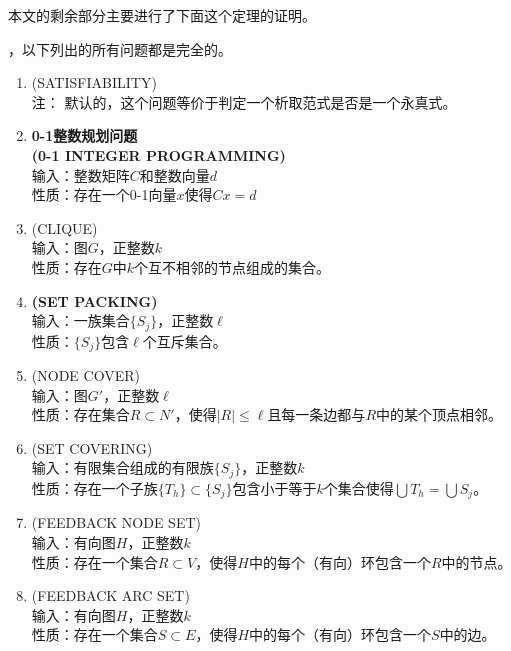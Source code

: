 \documentclass[twocolumn]{article}
\theoremstyle{nonumberplain}%
\begin{document}
\begin{CJK}{UTF8}{gbsn}
    本文的剩余部分主要进行了下面这个定理的证明。

    {}，以下列出的所有问题都是完全的。

    \begin{enumerate}
    \item {(SATISFIABILITY)}\\
    注： 默认的，这个问题等价于判定一个析取范式是否是一个永真式。

    \item {\bf0-1整数规划问题\\(0-1 INTEGER PROGRAMMING)}\\
    输入：整数矩阵$C$和整数向量$d$\\
    性质：存在一个0-1向量$x$使得$Cx=d$

    \item {(CLIQUE)}\\
    输入：图$G$，正整数$k$\\
    性质：存在$G$中$k$个互不相邻的节点组成的集合。

    \item {\bf(SET PACKING)}\\
    输入：一族集合$\{S_j\}$，正整数$\ell$\\
    性质：$\{S_j\}$包含$\ell$个互斥集合。

    \item {(NODE COVER)}\\
    输入：图$G'$，正整数$\ell$\\
    性质：存在集合$R\subset N'$，使得$|R|\leq\ell$且每一条边都与$R$中的某个顶点相邻。

    \item {(SET COVERING)}\\
    输入：有限集合组成的有限族$\{S_j\}$，正整数$k$\\
    性质：存在一个子族$\{T_h\}\subset\{S_j\}$包含小于等于$k$个集合使得$\bigcup T_h=\bigcup S_j$。

    \item {(FEEDBACK NODE SET)}\\
    输入：有向图$H$，正整数$k$\\
    性质：存在一个集合$R\subset V$，使得$H$中的每个（有向）环包含一个$R$中的节点。

    \item {(FEEDBACK ARC SET)}\\
    输入：有向图$H$，正整数$k$\\
    性质：存在一个集合$S\subset E$，使得$H$中的每个（有向）环包含一个$S$中的边。


\end{enumerate}
\end{CJK}
\end{document}
